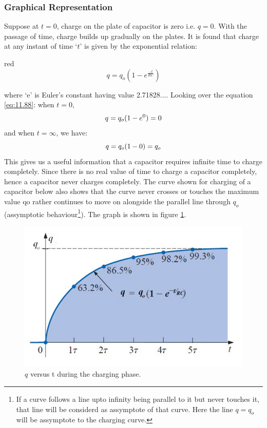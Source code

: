 \subsubsection{Graphical Representation}
Suppose at $t = 0$, charge on the plate of capacitor is zero i.e. $q = 0$.
With the passage of time, charge builds up gradually on the plates.
It is found that charge at any instant of time `$t$' is given by
the exponential relation:
\begin{mybox}{red}{}
  \begin{equation}\label{eq:11.88}
    q = q_{o}(1-e^{\frac{-t}{RC}})
  \end{equation}
\end{mybox}
\noindent where `e’ is Euler’s constant having value 2.71828....
Looking over the equation \ref{eq:11.88}:
when $t = 0$,
\begin{equation}\notag
  q = q_{o}(1-e^{0}) = 0
\end{equation}
and when $t = \infty$, we have:
\begin{equation}\notag
  q = q_{o}(1-0) = q_{o}
\end{equation}
This gives us a useful information that a capacitor requires infinite
time to charge completely. Since there is no real value of time to
charge a capacitor completely, hence a capacitor never charges completely.
The curve shown for charging of a capacitor below also shows that
the curve never crosses or touches the maximum value qo rather
continues to move on
alongside the parallel line through $q_{o}$ (assymptotic
behaviour\footnote{
  If a curve follows a line upto infinity being parallel to it but never touches it,
  that line will be considerd as assymptote of that curve. Here the line $q = q_{o}$ will
  be assymptote to the charging curve.
}). The graph is shown in figure \ref{fig:11.37}.
\begin{figure}[H]
  \centering
  \includegraphics[scale = 0.4]{Images/Chapter-11/11.37}
  \caption{$q$ versus t during the charging phase.}
  \label{fig:11.37}
\end{figure}
